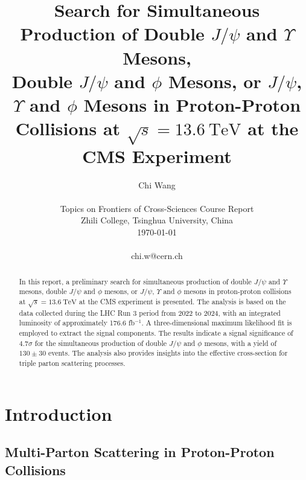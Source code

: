 \documentclass[10pt,twocolumn]{article}
\begin{document}
\title{Search for Simultaneous Production of Double $J/\psi$ and $\Upsilon$ Mesons,\\Double $J/\psi$ and $\phi$ Mesons, or $J/\psi$, $\Upsilon$ and $\phi$ Mesons in Proton-Proton\\ Collisions at $\sqrt{s} = 13.6 ~ \mathrm{TeV}$ at the CMS Experiment}

\author{Chi Wang \\
\\
Topics on Frontiers of Cross-Sciences Course Report \\
Zhili College, Tsinghua University, China \\
\today
\\
\\
chi.w@cern.ch  \\
}

\maketitle
\thispagestyle{empty}

\begin{abstract}

In this report, a preliminary search for simultaneous production of double $J/\psi$ and $\Upsilon$ mesons, double $J/\psi$ and $\phi$ mesons, or $J/\psi$, $\Upsilon$ and $\phi$ mesons in proton-proton collisions at $\sqrt{s} = 13.6 ~ \mathrm{TeV}$ at the CMS experiment is presented. The analysis is based on the data collected during the LHC Run 3 period from 2022 to 2024, with an integrated luminosity of approximately 176.6 fb$^{-1}$. A three-dimensional maximum likelihood fit is employed to extract the signal components. The results indicate a signal significance of $4.7 \sigma$ for the simultaneous production of double $J/\psi$ and $\phi$ mesons, with a yield of $130 \pm 30$ events. The analysis also provides insights into the effective cross-section for triple parton scattering processes.

\end{abstract}


\section{Introduction}

\subsection{Multi-Parton Scattering in Proton-Proton Collisions}
\end{document}
